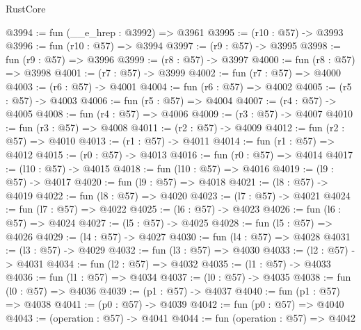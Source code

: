 \begin{lexlean}{RustCore}
\begin{coremodule}
@3994 := fun (__e_hrep : @3992) => @3961
@3995 := (r10 : @57) -> @3993
@3996 := fun (r10 : @57) => @3994
@3997 := (r9 : @57) -> @3995
@3998 := fun (r9 : @57) => @3996
@3999 := (r8 : @57) -> @3997
@4000 := fun (r8 : @57) => @3998
@4001 := (r7 : @57) -> @3999
@4002 := fun (r7 : @57) => @4000
@4003 := (r6 : @57) -> @4001
@4004 := fun (r6 : @57) => @4002
@4005 := (r5 : @57) -> @4003
@4006 := fun (r5 : @57) => @4004
@4007 := (r4 : @57) -> @4005
@4008 := fun (r4 : @57) => @4006
@4009 := (r3 : @57) -> @4007
@4010 := fun (r3 : @57) => @4008
@4011 := (r2 : @57) -> @4009
@4012 := fun (r2 : @57) => @4010
@4013 := (r1 : @57) -> @4011
@4014 := fun (r1 : @57) => @4012
@4015 := (r0 : @57) -> @4013
@4016 := fun (r0 : @57) => @4014
@4017 := (l10 : @57) -> @4015
@4018 := fun (l10 : @57) => @4016
@4019 := (l9 : @57) -> @4017
@4020 := fun (l9 : @57) => @4018
@4021 := (l8 : @57) -> @4019
@4022 := fun (l8 : @57) => @4020
@4023 := (l7 : @57) -> @4021
@4024 := fun (l7 : @57) => @4022
@4025 := (l6 : @57) -> @4023
@4026 := fun (l6 : @57) => @4024
@4027 := (l5 : @57) -> @4025
@4028 := fun (l5 : @57) => @4026
@4029 := (l4 : @57) -> @4027
@4030 := fun (l4 : @57) => @4028
@4031 := (l3 : @57) -> @4029
@4032 := fun (l3 : @57) => @4030
@4033 := (l2 : @57) -> @4031
@4034 := fun (l2 : @57) => @4032
@4035 := (l1 : @57) -> @4033
@4036 := fun (l1 : @57) => @4034
@4037 := (l0 : @57) -> @4035
@4038 := fun (l0 : @57) => @4036
@4039 := (p1 : @57) -> @4037
@4040 := fun (p1 : @57) => @4038
@4041 := (p0 : @57) -> @4039
@4042 := fun (p0 : @57) => @4040
@4043 := (operation : @57) -> @4041
@4044 := fun (operation : @57) => @4042
\end{coremodule}
\end{lexlean}
